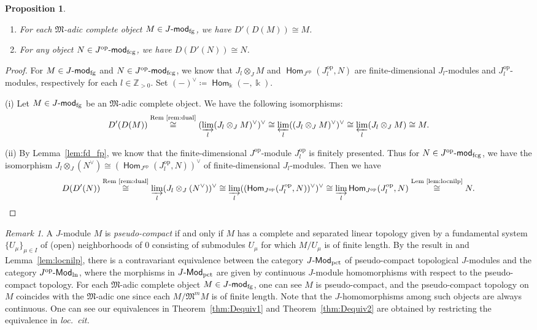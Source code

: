 \documentclass[12pt]{amsart}
\newtheorem{proposition}[theorem]{Proposition}
\theoremstyle{definition}
\theoremstyle{remark}
\newtheorem{remark}[theorem]{Remark}
\numberwithin{equation}{section}
\newcommand{\opname}[1]{\operatorname{\mathsf{#1}}}
\newcommand{\Hom}{\opname{Hom}}
\newcommand{\modfg}{\mathchar`-\mathsf{mod}_{\mathrm{fg}}}
\newcommand{\modfcg}{\mathchar`-\mathsf{mod}_{\mathrm{fcg}}}
\newcommand{\op}{\mathrm{op}}
\newcommand{\fM}{\mathfrak{M}}
\newcommand{\Modln}{\mathchar`-\mathsf{Mod}_{\mathrm{ln}}}
\newcommand{\Modpct}{\mathchar`-\mathsf{Mod}_{\mathrm{pct}}}
\begin{document}
\begin{proposition}\label{prop:DD}
    \begin{enumerate}
        \item[(i)] For each $\fM$-adic complete object $M\in J\modfg$, we have $D'(D(M))\cong M$.
        \item[(ii)] For any object $N\in J^\op\modfcg$, we have $D(D'(N))\cong N$.
    \end{enumerate}
\end{proposition}
\begin{proof}
   

For  $M \in J\modfg$ and $N \in J^\op \modfcg$, we know that $J_l \otimes_J M$ and $\Hom_{J^{\op}}(J_l^\op,N)$ are finite-dimensional  $J_l$-modules and $J_l^{\op}$-modules, respectively for each $l \in \mathbb{Z}_{>0}$. Set $(-)^\vee \coloneqq \Hom_{\Bbbk }(-, \Bbbk )$.

(i) Let $M \in J\modfg$ be an $\fM$-adic complete object. We have  the following isomorphisms:
    \[
    D'(D(M)) \overset{\text{Rem~\ref{rem:dual}}}{\cong} (\varinjlim_l (J_l \otimes_J M)^\vee)^\vee 
     \cong \varprojlim_l ((J_l \otimes_J M )^\vee)^\vee 
     \cong \varprojlim_l (J_l \otimes_J M) 
    \cong M.
    \]


   (ii) By Lemma~\ref{lem:fd_fp}, we know that the finite-dimensional $J^\op$-module $J_l^\op$ is finitely presented. Thus for  $N\in J^\op\modfcg$, we have the isomorphism $J_l \otimes_J (N^\vee) \cong (\Hom_{J^{\op}}(J_l^\op,N))^\vee$ of finite-dimensional $J_l$-modules. Then we have
    \[
    D(D'(N)) \overset{\text{Rem~\ref{rem:dual}}}{\cong} \varinjlim_l (J_l \otimes_J (N^\vee) )^\vee  
    \cong \varinjlim_l ((\Hom_{J^{\op}}(J_l^\op,N))^\vee)^\vee \cong \varinjlim_l \Hom_{J^{\op}}(J_l^\op,N)
    \overset{\text{Lem \ref{lem:locnilp}}}{\cong} N.\qedhere\]
    \end{proof}
\begin{remark}\label{rem:contdual}
     A $J$-module $M$ is \emph{pseudo-compact} if and only if $M$ has a complete and separated linear topology given by a fundamental system $\{U_\mu\}_{\mu\in I}$ of (open) neighborhoods of $0$ consisting of submodules $U_\mu$ for which $M/U_\mu$ is of finite length. By the result in \cite[Proposition~2.3]{Bru66} and Lemma~\ref{lem:locnilp}, there is a contravariant equivalence between the category $J\Modpct$ of pseudo-compact topological $J$-modules and the category $J^\op\Modln$, where the morphisms in $J\Modpct$ are given by continuous $J$-module homomorphisms with respect to the pseudo-compact topology. For each $\fM$-adic complete object $M\in J\modfg$, one can see $M$ is pseudo-compact, and the pseudo-compact topology on $M$ coincides with the $\fM$-adic one since each $M/\fM^m M$ is of finite length. Note that the $J$-homomorphisms among such objects are always continuous.
    One can see our equivalences in Theorem~\ref{thm:Dequiv1} and Theorem~\ref{thm:Dequiv2} are obtained by restricting the equivalence in \textit{loc.~cit.}
\end{remark}
\end{document}
